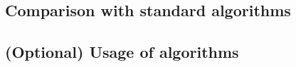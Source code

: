 \documentclass[runningheads]{llncs}
\begin{document}
\subsection{Comparison with standard algorithms}


\subsection{(Optional) Usage of algorithms}

\newpage
\end{document}
